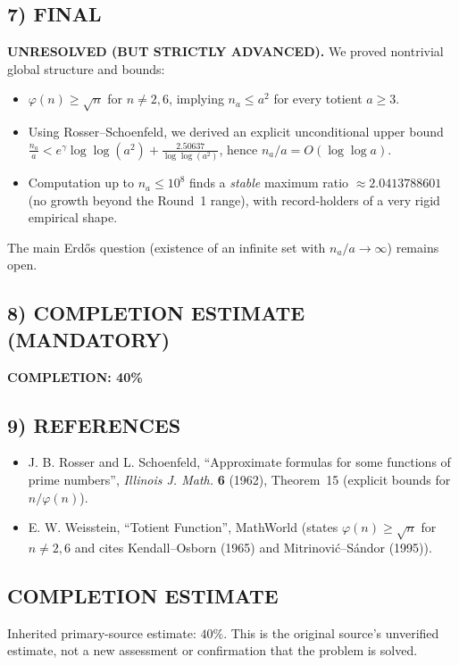 \subsection*{7) FINAL}
\textbf{UNRESOLVED (BUT STRICTLY ADVANCED).}
We proved nontrivial global structure and bounds:
\begin{itemize}
\item $\varphi(n)\ge \sqrt n$ for $n\neq 2,6$, implying $n_a\le a^2$ for every totient $a\ge 3$.
\item Using Rosser--Schoenfeld, we derived an explicit unconditional upper bound
$\displaystyle \frac{n_a}{a}<e^{\gamma}\log\log(a^2)+\frac{2.50637}{\log\log(a^2)}$, hence $n_a/a=O(\log\log a)$.
\item Computation up to $n_a\le 10^8$ finds a \emph{stable} maximum ratio $\approx 2.0413788601$ (no growth beyond the Round~1 range), with record-holders of a very rigid empirical shape.
\end{itemize}
The main Erd\H{o}s question (existence of an infinite set with $n_a/a\to\infty$) remains open.

\subsection*{8) COMPLETION ESTIMATE (MANDATORY)}
\textbf{COMPLETION: 40\%}

\subsection*{9) REFERENCES}
\begin{itemize}
\item J. B. Rosser and L. Schoenfeld, ``Approximate formulas for some functions of prime numbers'', \emph{Illinois J. Math.} \textbf{6} (1962), Theorem~15 (explicit bounds for $n/\varphi(n)$).
\item E. W. Weisstein, ``Totient Function'', MathWorld (states $\varphi(n)\ge \sqrt n$ for $n\neq 2,6$ and cites Kendall--Osborn (1965) and Mitrinovi\'c--S\'andor (1995)).
\end{itemize}


\subsection*{COMPLETION ESTIMATE}
Inherited primary-source estimate: $40\%$. This is the original source's unverified estimate, not a new assessment or confirmation that the problem is solved.
